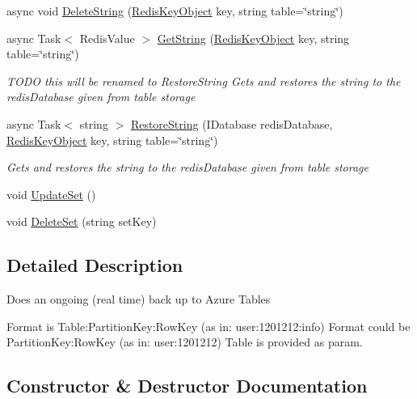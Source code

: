 \begin{DoxyCompactItemize}
async void \hyperlink{class_demgel_redis_1_1_backing_manager_1_1_table_redis_backup_a69becf1c831cc6570d5068f9a155229d}{Delete\+String} (\hyperlink{class_demgel_redis_1_1_common_1_1_redis_key_object}{Redis\+Key\+Object} key, string table=\char`\"{}string\char`\"{})
\item 
async Task$<$ Redis\+Value $>$ \hyperlink{class_demgel_redis_1_1_backing_manager_1_1_table_redis_backup_a4576be1120b15bdcbeefb034ad7e7851}{Get\+String} (\hyperlink{class_demgel_redis_1_1_common_1_1_redis_key_object}{Redis\+Key\+Object} key, string table=\char`\"{}string\char`\"{})
\begin{DoxyCompactList}\small\item\em T\+O\+D\+O this will be renamed to Restore\+String Gets and restores the string to the redis\+Database given from table storage \end{DoxyCompactList}\item 
async Task$<$ string $>$ \hyperlink{class_demgel_redis_1_1_backing_manager_1_1_table_redis_backup_a24333973d03cd2e2b8777f595a7e6470}{Restore\+String} (I\+Database redis\+Database, \hyperlink{class_demgel_redis_1_1_common_1_1_redis_key_object}{Redis\+Key\+Object} key, string table=\char`\"{}string\char`\"{})
\begin{DoxyCompactList}\small\item\em Gets and restores the string to the redis\+Database given from table storage \end{DoxyCompactList}\item 
void \hyperlink{class_demgel_redis_1_1_backing_manager_1_1_table_redis_backup_a4486624948798324e6ff2e749e1b782f}{Update\+Set} ()
\item 
void \hyperlink{class_demgel_redis_1_1_backing_manager_1_1_table_redis_backup_a9f74c31912d81a3eac575e7f7a4f816d}{Delete\+Set} (string set\+Key)
\end{DoxyCompactItemize}


\subsection{Detailed Description}
Does an ongoing (real time) back up to Azure Tables 

Format is Table\+:\+Partition\+Key\+:Row\+Key (as in\+: user\+:1201212\+:info) Format could be Partition\+Key\+:Row\+Key (as in\+: user\+:1201212) Table is provided as param. 

\subsection{Constructor \& Destructor Documentation}
\hypertarget{class_demgel_redis_1_1_backing_manager_1_1_table_redis_backup_afe95b88cc08f6cd336f8b9befd838487}{}
